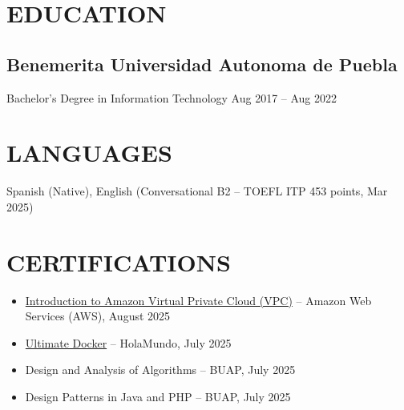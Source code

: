 \documentclass[a4paper,10pt]{article}
\begin{document}
\section*{EDUCATION}

\subsection*{Benemerita Universidad Autonoma de Puebla}
Bachelor's Degree in Information Technology \hfill Aug 2017 -- Aug 2022

\section*{LANGUAGES}
Spanish (Native), English (Conversational B2 -- TOEFL ITP 453 points, Mar 2025)

\section*{CERTIFICATIONS}
\begin{itemize}[noitemsep, leftmargin=*]
    \item \href{https://www.linkedin.com/in/jose-carlos-huerta-garcia-773952212/details/certifications}{Introduction to Amazon Virtual Private Cloud (VPC)} -- Amazon Web Services (AWS), August 2025
    \item \href{https://academia.holamundo.io/certificates/fifvbfywmp}{Ultimate Docker} -- HolaMundo, July 2025
    \item Design and Analysis of Algorithms -- BUAP, July 2025
    \item Design Patterns in Java and PHP -- BUAP, July 2025
\end{itemize}
\end{document}
